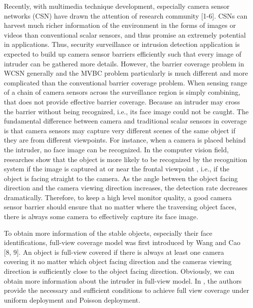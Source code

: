 \documentclass[3p]{elsarticle}
\begin{document}
Recently, with multimedia technique development, especially camera sensor networks (CSN) have drawn the attention of research community [1-6]. CSNs can harvest much richer information of the environment in the forms of images or videos than conventional scalar sensors, and thus promise an extremely potential in applications. Thus, security surveillance or intrusion detection application is expected to build up camera sensor barriers efficiently such that every image of intruder can be gathered more details. However, the barrier coverage problem in WCSN generally and the MVBC problem particularly is much different and more complicated than the conventional barrier coverage problem. When sensing range of a chain of camera sensors across the surveillance region is simply combining, that does not provide effective barrier coverage. Because an intruder may cross the barrier without being recognized, i.e., its face image could not be caught. The  fundamental difference between camera and traditional scalar sensors in coverage is that camera sensors may capture very different scenes of the same object if they are from different viewpoints. For instance, when a camera is placed behind the intruder, no face image can be recognized. In the computer vision field, researches show that the object is more likely to be recognized by the recognition system if the image is captured at or near the frontal viewpoint \cite{blanz2005face}, i.e., if the object is facing straight to the camera. As the angle between the object facing direction and the camera viewing direction increases, the detection rate decreases dramatically. Therefore, to keep a high level monitor quality, a good camera sensor barrier should ensure that no matter where the traversing object faces, there is always some camera to effectively capture its face image.\par
%
To obtain more information of the stable objects, especially their face identifications, full-view coverage model was first introduced by Wang and Cao [8, 9]. An object is full-view covered if there is always at least one camera covering it no matter which object facing direction and the cameras viewing direction is sufficiently close to the object facing direction. Obviously, we can obtain more information about the intruder in full-view model. In \cite{wu2012achieving}, the authors provide the necessary and sufficient conditions to achieve full view coverage under uniform deployment and Poisson deployment. \par
%
\end{document}
